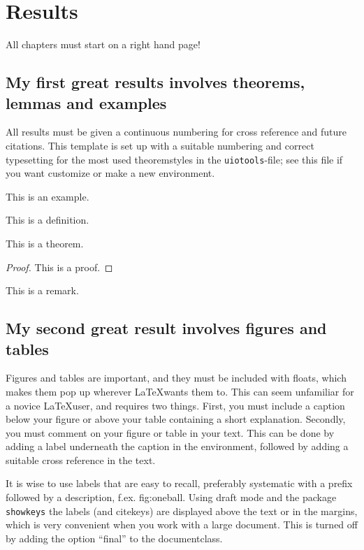 \chapter{Results}
\label{results}
All chapters must start on a right hand page!

\section{My first great results involves theorems, lemmas and examples}
All results must be given a continuous numbering for cross reference and future citations. This template is set up with a suitable numbering and correct typesetting for the most used theoremstyles in the \texttt{uiotools}-file; see this file if you want customize or make a new environment. 

\begin{example}
    This is an example.
\end{example}

\begin{definition}
    This is a definition.
\end{definition}

\begin{theorem}
    This is a theorem.
\end{theorem}

\begin{proof}
    This is a proof.
\end{proof}

\begin{remark}
 This is a remark.    
\end{remark}



\section{My second great result involves figures and tables}
Figures and tables are important, and they must be included with floats, which makes them pop up wherever \LaTeX wants them to. This can seem unfamiliar for a novice \LaTeX user, and requires two things. First, you must include a caption below your figure or above your table containing a short explanation. Secondly, you must comment on your figure or table in your text. This can be done by adding a label underneath the caption in the environment, followed by adding a suitable cross reference in the text. 

It is wise to use labels that are easy to recall, preferably systematic with a prefix followed by a description, f.ex. fig:oneball. Using draft mode and the package {\texttt {showkeys}} the labels (and citekeys) are displayed above the text or in the margins, which is very convenient when you work with a large document. This is turned off by adding the option \enquote{final} to the documentclass.

